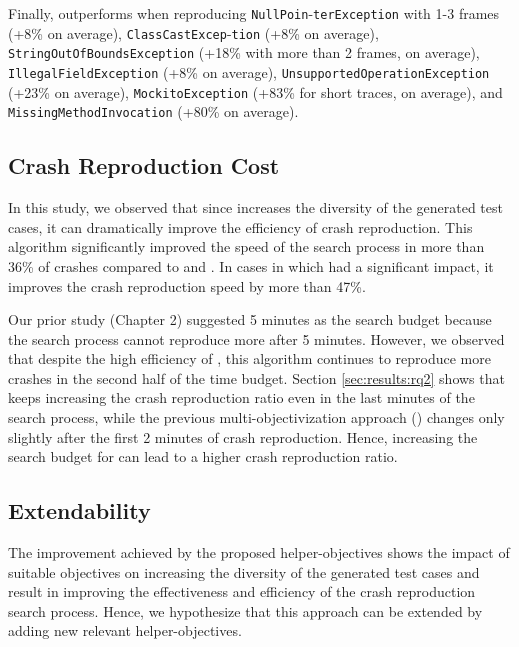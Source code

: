 Finally, \moho outperforms \decomposition when reproducing \texttt{NullPoin}-\texttt{terException} with 1-3 frames (+8\% on average), \texttt{ClassCastExcep}-\texttt{tion} (+8\% on average), \texttt{StringOutOfBoundsException} (+18\% with more than 2 frames, on average), 
\texttt{IllegalFieldException} (+8\% on average),
\texttt{UnsupportedOperationException} (+23\% on average),
\texttt{MockitoException} (+83\% for short traces, on average), and \texttt{MissingMethodInvocation} (+80\% on average).

\subsection{Crash Reproduction Cost}
In this study, we observed that since \moho increases the diversity of the generated test cases, it can dramatically improve the efficiency of crash reproduction. This algorithm significantly improved the speed of the search process in more than 36\% of crashes compared to \SGGA and \decomposition. In cases in which \moho had a significant impact, it improves the crash reproduction speed by more than 47\%.

Our prior study (Chapter 2) suggested 5 minutes as the search budget because the search process cannot reproduce more after 5 minutes. However, we observed that despite the high efficiency of \moho, this algorithm continues to reproduce more crashes in the second half of the time budget. Section \ref{sec:results:rq2} shows that \moho keeps increasing the crash reproduction ratio even in the last minutes of the search process, while the previous multi-objectivization approach (\decomposition) changes only slightly after the first 2 minutes of crash reproduction. Hence, increasing the search budget for \moho can lead to a higher crash reproduction ratio.


\subsection{Extendability}

The improvement achieved by the proposed helper-objectives shows the impact of suitable objectives on increasing the diversity of the generated test cases and result in improving the effectiveness and efficiency of the crash reproduction search process. Hence, we hypothesize that this approach can be extended by adding new relevant helper-objectives.